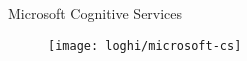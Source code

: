 %
\begin{frame}[t]{Microsoft Cognitive Services}
	\begin{figure}[!h]
	\centering
	\vfill
	\texttt{[image: loghi/microsoft-cs]}
	\vfill
	\end{figure}
\end{frame}
%
